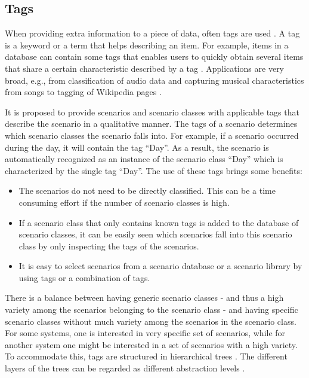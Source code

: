 \subsection{Tags}
\label{sec:tags}

When providing extra information to a piece of data, often tags are used \cite{smith2007tagging}. A tag is a keyword or a term that helps describing an item. For example, items in a database can contain some tags that enables users to quickly obtain several items that share a certain characteristic described by a tag \cite{craft2004tagging, vasquez2019controlling}. Applications are very broad, e.g., from classification of audio data \cite{kong2017joint} and capturing musical characteristics from songs \cite{ellis2011semantic} to tagging of Wikipedia pages \cite{voss2006collaborative}.

It is proposed to provide scenarios and scenario classes with applicable tags that describe the scenario in a qualitative manner. The tags of a scenario determines which scenario classes the scenario falls into. For example, if a scenario occurred during the day, it will contain the tag ``Day''. As a result, the scenario is automatically recognized as an instance of the scenario class ``Day'' which is characterized by the single tag ``Day''. The use of these tags brings some benefits:
\begin{itemize}
	\item The scenarios do not need to be directly classified. This can be a time consuming effort if the number of scenario classes is high.
	\item If a scenario class that only contains known tags is added to the database of scenario classes, it can be easily seen which scenarios fall into this scenario class by only inspecting the tags of the scenarios.
	\item It is easy to select scenarios from a scenario database or a scenario library by using tags or a combination of tags.
\end{itemize}

There is a balance between having generic scenario classes - and thus a high variety among the scenarios belonging to the scenario class - and having specific scenario classes without much variety among the scenarios in the scenario class. For some systems, one is interested in very specific set of scenarios, while for another system one might be interested in a set of scenarios with a high variety. To accommodate this, tags are structured in hierarchical trees \cite{molloy2017dynamic, badger2012dynamic}. The different layers of the trees can be regarded as different abstraction levels \cite{Bonnin2014}. 

